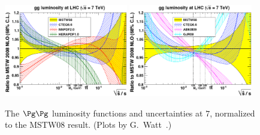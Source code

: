 \begin{figure}[ht]
\begin{center}
\includegraphics[width=0.48\textwidth]{YRHXS_PDF/YRHXS_PDF_1.eps}
\includegraphics[width=0.48\textwidth]{YRHXS_PDF/YRHXS_PDF_2.eps}
\vspace{-0.8cm}
\caption{\label{fig:gglum} The $\Pg\Pg$  
luminosity functions and
uncertainties at $7$\UTeV, normalized to the MSTW08 result. 
(Plots by G.~Watt~\cite{Watt}.)}
\vspace{-0.6cm}
\end{center}
\end{figure}



